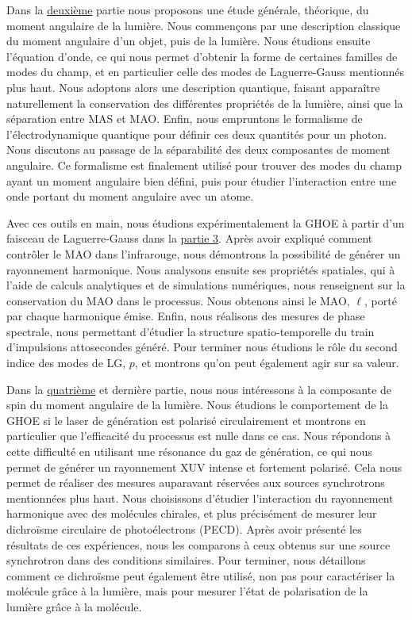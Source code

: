Dans la \hyperref[PA:LightAM]{deuxième} partie nous proposons une étude générale, théorique, du moment angulaire de la lumière. Nous commençons par une description classique du moment angulaire d'un objet, puis de la lumière. Nous étudions ensuite l'équation d'onde, ce qui nous permet d'obtenir la forme de certaines familles de modes du champ, et en particulier celle des modes de Laguerre-Gauss mentionnés plus haut. Nous adoptons alors une description quantique, faisant apparaître naturellement la conservation des différentes propriétés de la lumière, ainsi que la séparation entre MAS et MAO. Enfin, nous empruntons le formalisme de l'électrodynamique quantique pour définir ces deux quantités pour un photon. Nous discutons au passage de la séparabilité des deux composantes de moment angulaire. Ce formalisme est finalement utilisé pour trouver des modes du champ ayant un moment angulaire bien défini, puis pour étudier l'interaction entre une onde portant du moment angulaire avec un atome.

Avec ces outils en main, nous étudions expérimentalement la GHOE à partir d'un faisceau de Laguerre-Gauss dans la \hyperref[PA:OAM_HHG]{partie 3}. Après avoir expliqué comment contrôler le MAO dans l'infrarouge, nous démontrons la possibilité de générer un rayonnement harmonique. Nous analysons ensuite ses propriétés spatiales, qui à l'aide de calculs analytiques et de simulations numériques, nous renseignent sur la conservation du MAO dans le processus. Nous obtenons ainsi le MAO, $\ell$, porté par chaque harmonique émise. Enfin, nous réalisons des mesures de phase spectrale, nous permettant d'étudier la structure spatio-temporelle du train d'impulsions attosecondes généré. Pour terminer nous étudions le rôle du second indice des modes de LG, $p$, et montrons qu'on peut également agir sur sa valeur.

Dans la \hyperref[PA:Spin_HHG]{quatrième} et dernière partie, nous nous intéressons à la composante de spin du moment angulaire de la lumière. Nous étudions le comportement de la GHOE si le laser de génération est polarisé circulairement et montrons en particulier que l'efficacité du processus est nulle dans ce cas. Nous répondons à cette difficulté en utilisant une résonance du gaz de génération, ce qui nous permet de générer un rayonnement XUV intense et fortement polarisé. Cela nous permet de réaliser des mesures auparavant réservées aux sources synchrotrons mentionnées plus haut. Nous choisissons d'étudier l'interaction du rayonnement harmonique avec des molécules chirales, et plus précisément de mesurer leur dichroïsme circulaire de photoélectrons (PECD). Après avoir présenté les résultats de ces expériences, nous les comparons à ceux obtenus sur une source synchrotron dans des conditions similaires. Pour terminer, nous détaillons comment ce dichroïsme peut également être utilisé, non pas pour caractériser la molécule grâce à la lumière, mais pour mesurer l'état de polarisation de la lumière grâce à la molécule.

